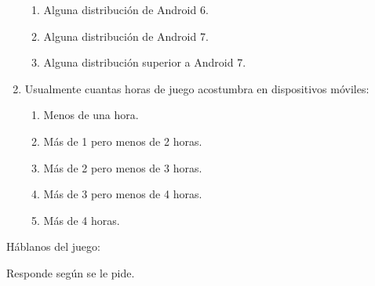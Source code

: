 \begin{enumerate}
\begin{enumerate}
            \item Alguna distribución de Android 6.
            \item Alguna distribución de Android 7.
            \item Alguna distribución superior a Android 7.
        \end{enumerate}
    \item Usualmente cuantas horas de juego acostumbra en dispositivos móviles:
        \begin{enumerate}
            \item Menos de una hora.
            \item Más de 1 pero menos de 2 horas.
            \item Más de 2 pero menos de 3 horas.
            \item Más de 3 pero menos de 4 horas.
            \item Más de 4 horas.
        \end{enumerate}
\end{enumerate}
Háblanos del juego:
\\
\par
Responde según se le pide.
